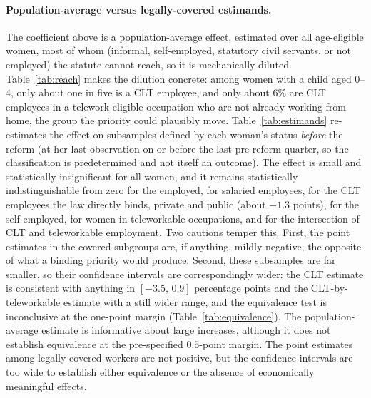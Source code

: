 \documentclass[12pt]{article}
\begin{document}
\paragraph{Population-average versus legally-covered estimands.} The coefficient above is a population-average effect, estimated over all age-eligible women, most of whom (informal, self-employed, statutory civil servants, or not employed) the statute cannot reach, so it is mechanically diluted. Table~\ref{tab:reach} makes the dilution concrete: among women with a child aged 0--4, only about one in five is a CLT employee, and only about 6\% are CLT employees in a telework-eligible occupation who are not already working from home, the group the priority could plausibly move. Table~\ref{tab:estimands} re-estimates the effect on subsamples defined by each woman's status \emph{before} the reform (at her last observation on or before the last pre-reform quarter, so the classification is predetermined and not itself an outcome). The effect is small and statistically insignificant for all women, and it remains statistically indistinguishable from zero for the employed, for salaried employees, for the CLT employees the law directly binds, private and public (about $-1.3$ points), for the self-employed, for women in teleworkable occupations, and for the intersection of CLT and teleworkable employment. Two cautions temper this. First, the point estimates in the covered subgroups are, if anything, mildly negative, the opposite of what a binding priority would produce. Second, these subsamples are far smaller, so their confidence intervals are correspondingly wider: the CLT estimate is consistent with anything in $[-3.5,\,0.9]$ percentage points and the CLT-by-teleworkable estimate with a still wider range, and the equivalence test is inconclusive at the one-point margin (Table~\ref{tab:equivalence}). The population-average estimate is informative about large increases, although it does not establish equivalence at the pre-specified $0.5$-point margin. The point estimates among legally covered workers are not positive, but the confidence intervals are too wide to establish either equivalence or the absence of economically meaningful effects.




\end{document}
